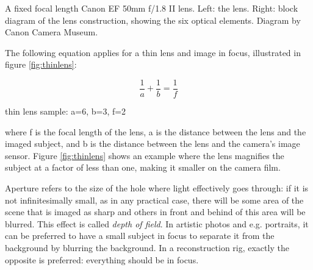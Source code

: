 {A fixed focal length Canon EF 50mm f/1.8 II lens. Left: the lens. Right: block diagram of the lens construction, showing the six optical elements. Diagram by Canon Camera Museum.}


The following equation applies for a thin lens and image in focus, illustrated in figure \ref{fig:thinlens}:

\begin{equation}
	\frac{1}{a} + \frac{1}{b} = \frac{1}{f} \label{eq:focal}
\end{equation}

{ thin lens sample: a=6, b=3, f=2 }

where f is the focal length of the lens, a is the distance between the lens and the imaged subject, and b is the distance between the lens and the camera's image sensor. Figure \ref{fig:thinlens} shows an example where the lens magnifies the subject at a factor of less than one, making it smaller on the camera film.



Aperture refers to the size of the hole where light effectively goes through: %
if it is not infinitesimally small, as in any practical case, there will be some area of the scene that is imaged as sharp and others in front and behind of this area will be blurred.
This effect is called \emph{depth of field}.
In artistic photos and e.g. portraits, it can be preferred to have a small subject in focus to separate it from the background by blurring the background.
In a reconstruction rig, exactly the opposite is preferred: everything should be in focus.

